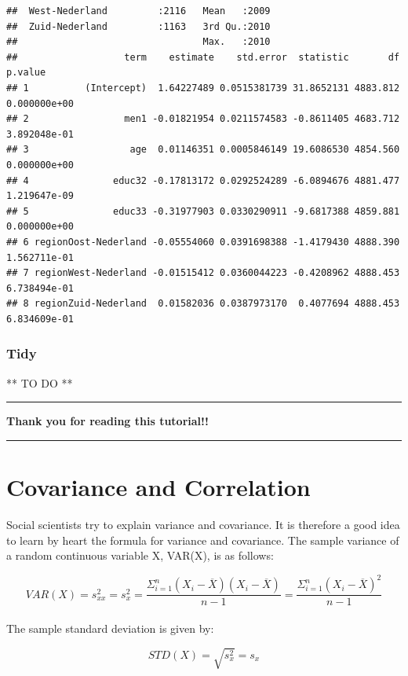 \documentclass[
]{book}
\begin{document}
\begin{verbatim}
##  West-Nederland         :2116   Mean   :2009  
##  Zuid-Nederland         :1163   3rd Qu.:2010  
##                                 Max.   :2010  
##                   term    estimate    std.error  statistic       df      p.value
## 1          (Intercept)  1.64227489 0.0515381739 31.8652131 4883.812 0.000000e+00
## 2                 men1 -0.01821954 0.0211574583 -0.8611405 4683.712 3.892048e-01
## 3                  age  0.01146351 0.0005846149 19.6086530 4854.560 0.000000e+00
## 4               educ32 -0.17813172 0.0292524289 -6.0894676 4881.477 1.219647e-09
## 5               educ33 -0.31977903 0.0330290911 -9.6817388 4859.881 0.000000e+00
## 6 regionOost-Nederland -0.05554060 0.0391698388 -1.4179430 4888.390 1.562711e-01
## 7 regionWest-Nederland -0.01515412 0.0360044223 -0.4208962 4888.453 6.738494e-01
## 8 regionZuid-Nederland  0.01582036 0.0387973170  0.4077694 4888.453 6.834609e-01
\end{verbatim}

\hypertarget{tidy-5}{%
\subsection{Tidy}\label{tidy-5}}

** TO DO **

\begin{center}\rule{0.5\linewidth}{0.5pt}\end{center}

\textbf{Thank you for reading this tutorial!!}

\begin{center}\rule{0.5\linewidth}{0.5pt}\end{center}

\hypertarget{variance}{%
\chapter{Covariance and Correlation}\label{variance}}

Social scientists try to explain variance and covariance. It is therefore a good idea to learn by heart the formula for variance and covariance. The sample variance of a random continuous variable X, VAR(X), is as follows:

\[VAR(X)=s_{xx}^2 = s_x^2= \frac{\Sigma^n_{i=1}(X_i-\overline{X})(X_i-\overline{X})}{n-1}= \frac{\Sigma^n_{i=1}(X_i-\overline{X})^2}{n-1}\]\\
The sample standard deviation is given by:

\[STD(X)=\sqrt{s_x^2}=s_x\]
\end{document}
